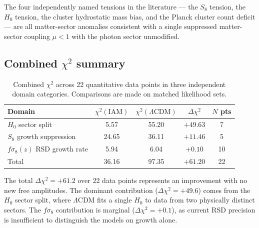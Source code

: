 \documentclass[12pt,a4paper]{article}
\begin{document}
\begin{table}[h]
\centering
\small
\caption{Sector census: 26 independent probes classified by IAM sector.}
\label{tab:census}
\end{table}

The four independently named tensions in the literature --- the $S_8$ tension, the
$H_0$ tension, the cluster hydrostatic mass bias, and the Planck cluster count deficit
--- are all matter-sector anomalies consistent with a single suppressed matter-sector
coupling $\mu < 1$ with the photon sector unmodified.

\subsection{Combined $\chi^2$ summary}

\begin{table}[h]
\centering
\small
\caption{Combined $\chi^2$ across 22 quantitative data points in three
independent domain categories. Comparisons are made on matched likelihood sets.}
\label{tab:chi2}
\begin{tabular}{lcccc}
\toprule
\textbf{Domain} & \textbf{$\chi^2(\mathrm{IAM})$} & \textbf{$\chi^2(\Lambda\mathrm{CDM})$} & \textbf{$\Delta\chi^2$} & \textbf{$N$ pts} \\
\midrule
$H_0$ sector split & 5.57 & 55.20 & $+49.63$ & 7 \\
$S_8$ growth suppression & 24.65 & 36.11 & $+11.46$ & 5 \\
$f\sigma_8(z)$ RSD growth rate & 5.94 & 6.04 & $+0.10$ & 10 \\
\midrule
Total & 36.16 & 97.35 & $+61.20$ & 22 \\
\bottomrule
\end{tabular}
\end{table}

The total $\Delta\chi^2 = +61.2$ over 22 data points represents an improvement with no
new free amplitudes. The dominant contribution ($\Delta\chi^2 = +49.6$) comes from the
$H_0$ sector split, where $\Lambda$CDM fits a single $H_0$ to data from two physically
distinct sectors. The $f\sigma_8$ contribution is marginal ($\Delta\chi^2 = +0.1$),
as current RSD precision is insufficient to distinguish the models on growth alone.
\end{document}

